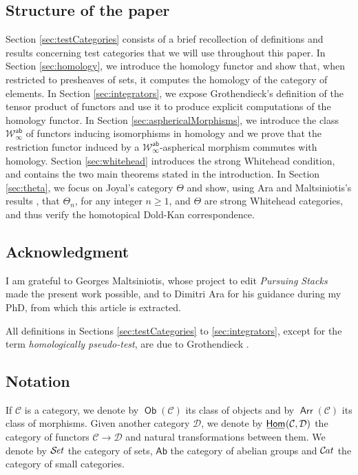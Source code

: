\documentclass[10pt, english, a4paper, nothms]{amsart}
\theoremstyle{plain}
\theoremstyle{remark}
\theoremstyle{definition}
\numberwithin{equation}{theorem}
\renewcommand\geq\geqslant
\newcommand{\Set}{{\mathcal{S}\mspace{-2.mu}\it{et}}}
\newcommand{\Cat}{{\mathcal{C}\mspace{-2.mu}\it{at}}}
\newcommand{\Ob}{\operatorname{\mathsf{Ob}}}
\newcommand{\Arr}{\operatorname{\mathsf{Arr}}}
\newcommand{\Homi}{\operatorname{\kern.5truept\underline{\kern-.5truept\mathsf{Hom}\kern-.5truept}\kern1truept}}
\newcommand{\W}{\mathcal{W}}
\newcommand{\Ab}{{\mathsf{Ab}}}
\newcommand{\ab}{{\mathsf{ab}}}
\newcommand{\Wab}{\W^{\ab}}
\begin{document}
\subsection*{Structure of the paper} 
Section \ref{sec:testCategories} consists of a brief recollection of definitions
and results concerning test categories that we will use throughout this paper.
In Section \ref{sec:homology}, we introduce the homology functor and show that,
when restricted to presheaves of sets, it computes the homology of the category
of elements. In Section \ref{sec:integrators}, we expose Grothendieck's
definition of the tensor product of functors and use it to produce explicit
computations of the homology functor. In Section \ref{sec:asphericalMorphisms},
we introduce the class $\Wab_\infty$ of functors inducing isomorphisms in
homology and we prove that the restriction functor induced by a
$\Wab_\infty$-aspherical morphism commutes with homology. Section
\ref{sec:whitehead} introduces the strong Whitehead condition, and contains the
two main theorems stated in the introduction. In Section \ref{sec:theta}, we
focus on Joyal's category $\Theta$ and show, using Ara and Maltsiniotis's
results \cite{ara2022compnerfs}, that $\Theta_n$, for any integer $n\geq1$, and
$\Theta$ are strong Whitehead categories, and thus verify the homotopical
Dold-Kan correspondence.

\subsection*{Acknowledgment}
I am grateful to Georges Maltsiniotis, whose project to edit \emph{Pursuing
Stacks} made the present work possible, and to Dimitri Ara for his guidance
during my PhD, from which this article is extracted.

All definitions in Sections \ref{sec:testCategories} to \ref{sec:integrators},
except for the term \emph{homologically pseudo-test}, are due to Grothendieck
\cite{pursuingstacks}. 

\subsection*{Notation}
If $\mathcal{C}$ is a category, we denote by $\Ob(\mathcal{C})$ its class of
objects and by $\Arr(\mathcal{C})$ its class of morphisms. Given another
category $\mathcal{D}$, we denote by $\Homi(\mathcal{C},\mathcal{D})$ the
category of functors $\mathcal{C}\to\mathcal{D}$ and natural transformations
between them. We denote by $\Set$ the category of sets, $\Ab$ the category of
abelian groups and $\Cat$ the category of small categories. 
\end{document}
